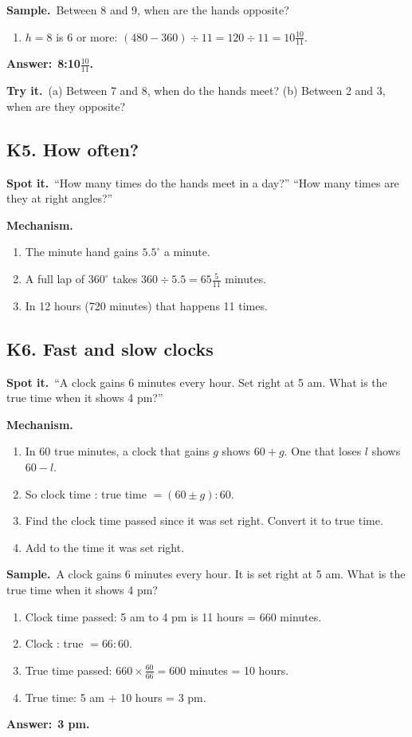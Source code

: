 \documentclass[11pt,a4paper]{article}
\let\oldsubsection\subsection
\renewcommand{\subsection}{\needspace{9\baselineskip}\oldsubsection}
\newcommand{\spot}{\textbf{\color{ember}Spot it.}\ }
\newcommand{\mech}{\textbf{\color{ember}Mechanism.}\ }
\newif\ifkeepsamp
\newcommand{\ans}[1]{\par\nopagebreak\noindent\textbf{\color{ember}Answer:}\ \textbf{#1}\par}
\newcommand{\samp}{\ifkeepsamp\needspace{4\baselineskip}\fi\textbf{\color{ember}Sample.}\ }
\newcommand{\tryit}[1]{\textbf{\color{ember}Try it.}\ #1}
\begin{document}
\samp Between 8 and 9, when are the hands opposite?
\begin{enumerate}
\item $h = 8$ is 6 or more: $(480 - 360) \div 11 = 120 \div 11 = 10\tfrac{10}{11}$.
\end{enumerate}
\ans{8:10$\tfrac{10}{11}$.}

\tryit (a) Between 7 and 8, when do the hands meet? (b) Between 2 and 3, when are they opposite?

\subsection{K5. How often?}
\spot ``How many times do the hands meet in a day?'' ``How many times are they at right angles?''

\mech
\begin{enumerate}
\item The minute hand gains $5.5^\circ$ a minute.
\item A full lap of $360^\circ$ takes $360 \div 5.5 = 65\tfrac5{11}$ minutes.
\item In 12 hours (720 minutes) that happens 11 times.
\end{enumerate}

\subsection{K6. Fast and slow clocks}
\spot ``A clock gains 6 minutes every hour. Set right at 5 am. What is the true time when it shows 4 pm?''

\mech
\begin{enumerate}
\item In 60 true minutes, a clock that gains $g$ shows $60 + g$. One that loses $l$ shows $60 - l$.
\item So clock time : true time $= (60 \pm g) : 60$.
\item Find the clock time passed since it was set right. Convert it to true time.
\item Add to the time it was set right.
\end{enumerate}

\samp A clock gains 6 minutes every hour. It is set right at 5 am. What is the true time when it shows 4 pm?
\begin{enumerate}
\item Clock time passed: 5 am to 4 pm is 11 hours = 660 minutes.
\item Clock : true $= 66 : 60$.
\item True time passed: $660 \times \tfrac{60}{66} = 600$ minutes = 10 hours.
\item True time: 5 am + 10 hours = 3 pm.
\end{enumerate}
\ans{3 pm.}
\end{document}
